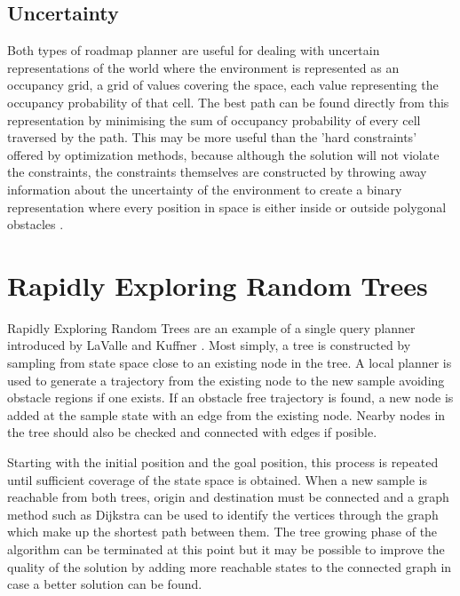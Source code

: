 \documentclass[11pt]{article} %
\begin{document}
\subsection{Uncertainty}
Both types of roadmap planner are useful for dealing with uncertain representations of the world where the environment is represented as an occupancy grid, a grid of values covering the space, each value representing the occupancy probability of that cell. The best path can be found directly from this representation by minimising the sum of occupancy probability of every cell traversed by the path. This may be more useful than the 'hard constraints' offered by optimization methods, because although the solution will not violate the constraints, the constraints themselves are constructed by throwing away information about the uncertainty of the environment to create a binary representation where every position in space is either inside or outside polygonal obstacles \cite{Pivtoraiko2009}.     

\section{Rapidly Exploring  Random Trees}
Rapidly Exploring Random Trees are an example of a single query planner introduced by LaValle and Kuffner \cite{Lavalle2001}. Most simply, a tree is constructed by sampling from state space close to an existing node in the tree. A local planner is used to generate a trajectory from the existing node to the new sample avoiding obstacle regions if one exists. If an obstacle free trajectory is found, a new node is added at the sample state with an edge from the existing node. Nearby nodes in the tree should also be checked and connected with edges if posible. 

Starting with the initial position and the goal position, this process is repeated until sufficient coverage of the state space is obtained. When a new sample is reachable from both trees, origin and destination must be connected and a graph method such as Dijkstra can be used to identify the vertices through the graph which make up the shortest path between them. The tree growing phase of the algorithm can be terminated at this point but it may be possible to improve the quality of the solution by adding more reachable states to the connected graph in case  a better solution can be found.  







%

\end{document}
